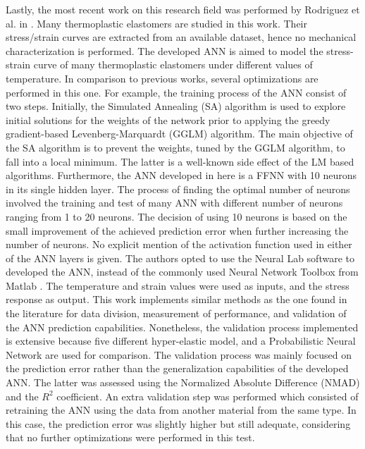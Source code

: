 Lastly, the most recent work on this research field was performed by Rodriguez et al. in \cite{rodriguez2019application}. Many thermoplastic elastomers are studied in this work. Their stress/strain curves are extracted from an available dataset, hence no mechanical characterization is performed. The developed ANN is aimed to model the stress-strain curve of many thermoplastic elastomers under different values of temperature. In comparison to previous works, several optimizations are performed in this one. For example, the training process of the ANN consist of two steps. Initially, the Simulated Annealing (SA) algorithm is used to explore initial solutions for the weights of the network prior to applying the greedy gradient-based Levenberg-Marquardt (GGLM) algorithm. The main objective of the SA algorithm is to prevent the weights, tuned by the GGLM algorithm, to fall into a local minimum. The latter is a well-known side effect of the LM based algorithms. Furthermore, the ANN developed in here is a FFNN with 10 neurons in its single hidden layer. The process of finding the optimal number of neurons involved the training and test of many ANN with different number of neurons ranging from 1 to 20 neurons. The decision of using 10 neurons is based on the small improvement of the achieved prediction error when further increasing the number of neurons. No explicit mention of the activation function used in either of the ANN layers is given. The authors opted to use the Neural Lab software to developed the ANN, instead of the commonly used Neural Network Toolbox from Matlab \textregistered{}. The temperature and strain values were used as inputs, and the stress response as output. This work implements similar methods as the one found in the literature for data division, measurement of performance, and validation of the ANN prediction capabilities. Nonetheless, the validation process implemented is extensive because five different hyper-elastic model, and a Probabilistic Neural Network are used for comparison. The validation process was mainly focused on the prediction error rather than the generalization capabilities of the developed ANN. The latter was assessed using the Normalized Absolute Difference (NMAD) and the $R^2$ coefficient. An extra validation step was performed which consisted of retraining the ANN using the data from another material from the same type. In this case, the prediction error was slightly higher but still adequate, considering that no further optimizations were performed in this test.

